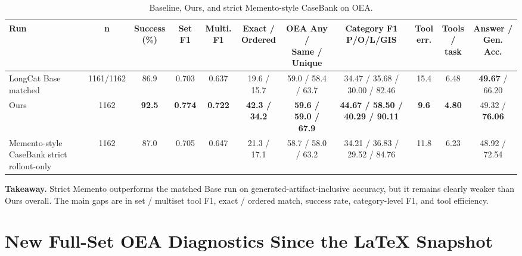 \documentclass[11pt]{article}
\begin{document}
\begin{table}[h]
\centering
\caption{Baseline, Ours, and strict Memento-style CaseBank on OEA.}
\scriptsize
\setlength{\tabcolsep}{2.2pt}
\renewcommand{\arraystretch}{1.12}
\begin{adjustbox}{max width=\textwidth}
\begin{tabular}{lcccccccccc}
\toprule
\textbf{Run} &
\textbf{n} &
\makecell{\textbf{Success}\\\textbf{(\%)}} &
\textbf{Set F1} &
\makecell{\textbf{Multi.}\\\textbf{F1}} &
\makecell{\textbf{Exact /}\\\textbf{Ordered}} &
\makecell{\textbf{OEA Any /}\\\textbf{Same / Unique}} &
\makecell{\textbf{Category F1}\\\textbf{P/O/L/GIS}} &
\makecell{\textbf{Tool}\\\textbf{err.}} &
\makecell{\textbf{Tools}\\\textbf{/ task}} &
\makecell{\textbf{Answer / Gen.}\\\textbf{Acc.}} \\
\midrule
LongCat Base matched & 1161/1162 & 86.9 & 0.703 & 0.637 & 19.6 / 15.7 & 59.0 / 58.4 / 63.7 & 34.47 / 35.68 / 30.00 / 82.46 & 15.4 & 6.48 & \textbf{49.67} / 66.20 \\
Ours & 1162 & \textbf{92.5} & \textbf{0.774} & \textbf{0.722} & \textbf{42.3 / 34.2} & \textbf{59.6 / 59.0 / 67.9} & \textbf{44.67 / 58.50 / 40.29 / 90.11} & \textbf{9.6} & \textbf{4.80} & 49.32 / \textbf{76.06} \\
Memento-style CaseBank strict rollout-only & 1162 & 87.0 & 0.705 & 0.647 & 21.3 / 17.1 & 58.7 / 58.0 / 63.2 & 34.21 / 36.83 / 29.52 / 84.76 & 11.8 & 6.23 & 48.92 / 72.54 \\
\bottomrule
\end{tabular}
\end{adjustbox}
\end{table}

\noindent\textbf{Takeaway.} Strict Memento outperforms the matched Base run on generated-artifact-inclusive accuracy, but it remains clearly weaker than Ours overall. The main gaps are in set / multiset tool F1, exact / ordered match, success rate, category-level F1, and tool efficiency.

\section{New Full-Set OEA Diagnostics Since the LaTeX Snapshot}
\end{document}
